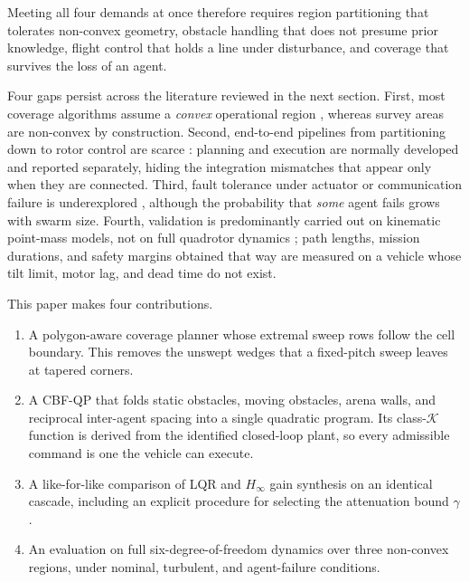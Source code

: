 \documentclass[10pt,letterpaper]{article}
\newcommand{\cit}[1]{\cite{#1}}
\newcommand{\citt}[2]{\cite{#1,#2}}
\begin{document}
Meeting all four demands at once therefore requires region partitioning that tolerates
non-convex geometry, obstacle handling that does not presume prior knowledge, flight
control that holds a line under disturbance, and coverage that survives the loss of an
agent.

Four gaps persist across the literature reviewed in the next section. First, most
coverage algorithms assume a \emph{convex} operational region
\citt{papatheodorouCooperativeVisual2017}{huRoutePlanning2021}, whereas survey areas are
non-convex by construction. Second, end-to-end pipelines from partitioning down to rotor
control are scarce \cit{huRoutePlanning2021}: planning and execution are normally
developed and reported separately, hiding the integration mismatches that appear only
when they are connected. Third, fault tolerance under actuator or communication failure
is underexplored \cit{okeeffeAnticipatingDegradation2025}, although the probability that
\emph{some} agent fails grows with swarm size. Fourth, validation is predominantly
carried out on kinematic point-mass models, not on full quadrotor dynamics
\cit{belkheiriLinearizationControl2012}; path lengths, mission durations, and safety
margins obtained that way are measured on a vehicle whose tilt limit, motor lag, and
dead time do not exist.

This paper makes four contributions.

\begin{enumerate}[nosep,leftmargin=*,topsep=4pt,label=(\roman*)]
    \item A polygon-aware coverage planner whose extremal sweep rows follow the cell
          boundary. This removes the unswept wedges that a fixed-pitch sweep leaves at
          tapered corners.
    \item A CBF-QP that folds static obstacles, moving obstacles, arena walls, and
          reciprocal inter-agent spacing into a single quadratic program. Its
          class-$\mathcal{K}$ function is derived from the identified closed-loop plant, so
          every admissible command is one the vehicle can execute.
    \item A like-for-like comparison of LQR and $H_\infty$ gain synthesis on an identical
          cascade, including an explicit procedure for selecting the attenuation bound
          $\gamma$.
    \item An evaluation on full six-degree-of-freedom dynamics over three non-convex
          regions, under nominal, turbulent, and agent-failure conditions.
\end{enumerate}
\end{document}
